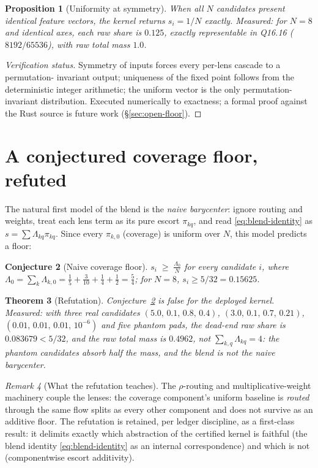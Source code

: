 \documentclass[12pt,oneside]{report}
\theoremstyle{plain}
\newtheorem{theorem}{Theorem}[chapter]
\newtheorem{proposition}[theorem]{Proposition}
\newtheorem{conjecture}[theorem]{Conjecture}
\theoremstyle{definition}
\theoremstyle{remark}
\newtheorem{remarkx}[theorem]{Remark}
\begin{document}
\begin{proposition}[Uniformity at symmetry]
\label{prop:uniform}
When all $N$ candidates present identical feature vectors, the kernel
returns $s_i = 1/N$ exactly. \emph{Measured}: for $N=8$ and identical
axes, each raw share is $0.125$, exactly representable in Q16.16
($8192/65536$), with raw total mass $1.0$.
\end{proposition}

\begin{proof}[Verification status]
Symmetry of inputs forces every per-lens cascade to a permutation-
invariant output; uniqueness of the fixed point follows from the
deterministic integer arithmetic; the uniform vector is the only
permutation-invariant distribution. Executed numerically to exactness;
a formal proof against the Rust source is future work
(\S\ref{sec:open-floor}).
\end{proof}

\section{A conjectured coverage floor, refuted}

The natural first model of the blend is the \emph{naive barycenter}:
ignore routing and weights, treat each lens term as its pure escort
$\pi_{kq}$, and read \eqref{eq:blend-identity} as
$s=\sum\Lambda_{kq}\pi_{kq}$. Since every $\pi_{k,0}$ (coverage) is
uniform over $N$, this model predicts a floor:

\begin{conjecture}[Naive coverage floor]
\label{conj:floor}
$s_i \;\ge\; \frac{\Lambda_0}{N}$ for every candidate $i$, where
$\Lambda_0=\sum_k\Lambda_{k,0} = \tfrac15+\tfrac3{10}+\tfrac14+\tfrac12
= \tfrac54$; for $N=8$, $s_i\ge 5/32 = 0.15625$.
\end{conjecture}

\begin{theorem}[Refutation]
Conjecture~\ref{conj:floor} is false for the deployed kernel.
\emph{Measured}: with three real candidates
$(5.0,\,0.1,\,0.8,\,0.4)$, $(3.0,\,0.1,\,0.7,\,0.21)$,
$(0.01,\,0.01,\,0.01,\,10^{-6})$ and five phantom pads, the dead-end
raw share is $0.083679 < 5/32$, and the raw total mass is $0.4962$,
not $\sum_{k,q}\Lambda_{kq}=4$: the phantom candidates absorb half the
mass, and the blend is not the naive barycenter.
\end{theorem}

\begin{remarkx}[What the refutation teaches]
The $\rho$-routing and multiplicative-weight machinery couple the
lenses: the coverage component's uniform baseline is \emph{routed}
through the same flow splits as every other component and does not
survive as an additive floor. The refutation is retained, per ledger
discipline, as a first-class result: it delimits exactly which
abstraction of the certified kernel is faithful (the blend identity
\eqref{eq:blend-identity} as an internal correspondence) and which is
not (componentwise escort additivity).
\end{remarkx}
\end{document}

